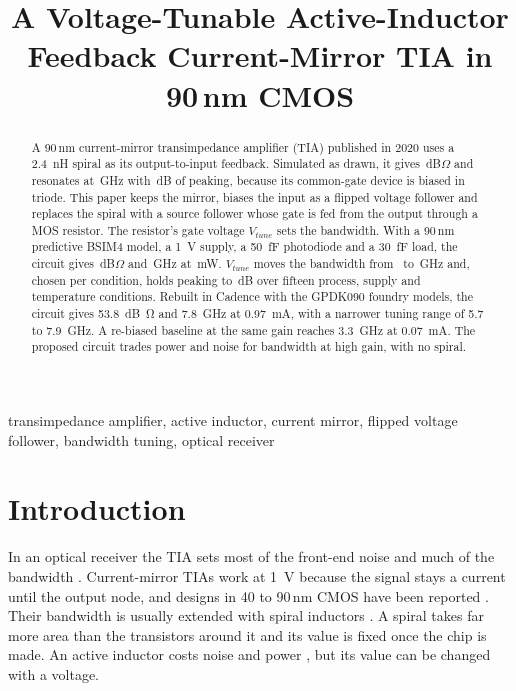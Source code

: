 \documentclass[conference]{IEEEtran}
\begin{document}
\title{A Voltage-Tunable Active-Inductor Feedback Current-Mirror TIA in 90\,nm CMOS}

\author{
}

\maketitle

\begin{abstract}
A 90\,nm current-mirror transimpedance amplifier (TIA) published in 2020 uses a \SI{2.4}{nH} spiral as its output-to-input feedback. Simulated as drawn, it gives \BZt\,dB$\Omega$ and resonates at \BFpk\,GHz with \BPk\,dB of peaking, because its common-gate device is biased in triode. This paper keeps the mirror, biases the input as a flipped voltage follower and replaces the spiral with a source follower whose gate is fed from the output through a MOS resistor. The resistor's gate voltage $V_{tune}$ sets the bandwidth. With a 90\,nm predictive BSIM4 model, a \SI{1}{V} supply, a \SI{50}{fF} photodiode and a \SI{30}{fF} load, the circuit gives \PZt\,dB$\Omega$ and \PBW\,GHz at \PPow\,mW. $V_{tune}$ moves the bandwidth from \TuneMin\ to \TuneMax\,GHz and, chosen per condition, holds peaking to \PvtPkTMax\,dB over fifteen process, supply and temperature conditions. Rebuilt in Cadence with the GPDK090 foundry models, the circuit gives \SI{53.8}{dB\ohm} and \SI{7.8}{GHz} at \SI{0.97}{mA}, with a narrower tuning range of 5.7 to \SI{7.9}{GHz}. A re-biased baseline at the same gain reaches \SI{3.3}{GHz} at \SI{0.07}{mA}. The proposed circuit trades power and noise for bandwidth at high gain, with no spiral.
\end{abstract}

\begin{IEEEkeywords}
transimpedance amplifier, active inductor, current mirror, flipped voltage follower, bandwidth tuning, optical receiver
\end{IEEEkeywords}

\section{Introduction}
In an optical receiver the TIA sets most of the front-end noise and much of the bandwidth \cite{razavi,sackinger}. Current-mirror TIAs work at \SI{1}{V} because the signal stays a current until the output node, and designs in 40 to 90\,nm CMOS have been reported \cite{zohoori,hassan,issa,alyas,shaaban}. Their bandwidth is usually extended with spiral inductors \cite{mohanbw}. A spiral takes far more area than the transistors around it and its value is fixed once the chip is made. An active inductor costs noise and power \cite{yuan,razaviai}, but its value can be changed with a voltage.
\end{document}
